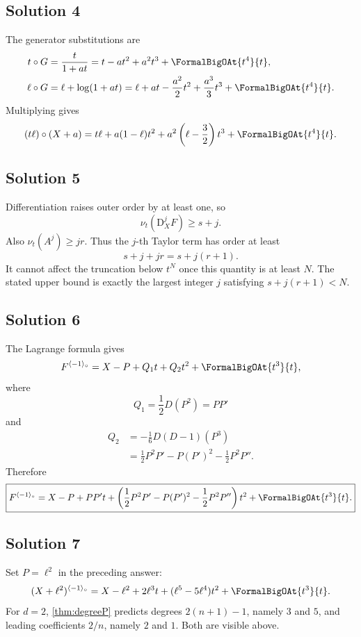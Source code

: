 \documentclass[11pt,oneside,openany]{book}
\newcommand{\ordt}{\nu_t}
\newcommand{\compose}{\mathbin{\circ}}
\newcommand{\rev}{^{\langle-1\rangle_{\circ}}}
\newcommand{\D}{\mathrm{D}}
\begin{document}
\subsection*{Solution 4}
The generator substitutions are
\begin{align*}
 t\compose G&=\frac{t}{1+at}
 =t-at^2+a^2t^3+\FormalBigOAt{t^4}{t},\\
 \ell\compose G&=\ell+\log(1+at)
 =\ell+at-\frac{a^2}{2}t^2+\frac{a^3}{3}t^3
 +\FormalBigOAt{t^4}{t}.
\end{align*}
Multiplying gives
\[
 (t\ell)\compose(X+a)
 =t\ell+a(1-\ell)t^2
 +a^2\left(\ell-\frac32\right)t^3
 +\FormalBigOAt{t^4}{t}.
\]

\subsection*{Solution 5}
Differentiation raises outer order by at least one, so
\[
 \ordt(\D_X^jF)\geq s+j.
\]
Also \(\ordt(A^j)\geq jr\).  Thus the \(j\)-th Taylor term has order at
least
\[
 s+j+jr=s+j(r+1).
\]
It cannot affect the truncation below \(t^N\) once this quantity is at least
\(N\).  The stated upper bound is exactly the largest integer \(j\) satisfying
\(s+j(r+1)<N\).

\subsection*{Solution 6}
The Lagrange formula gives
\[
 F\rev=X-P+Q_1t+Q_2t^2+\FormalBigOAt{t^3}{t},
\]
where
\[
 Q_1=\frac12D(P^2)=PP'
\]
and
\begin{align*}
 Q_2
 &=-\frac16D(D-1)(P^3)\\
 &=\frac12P^2P'-P(P')^2-\frac12P^2P''.
\end{align*}
Therefore
\begin{equation*}
 \boxed{
 F\rev=X-P+PP't+
 \left(\frac12P^2P'-P(P')^2-\frac12P^2P''\right)t^2
 +\FormalBigOAt{t^3}{t}.}
\end{equation*}

\subsection*{Solution 7}
Set \(P=\ell^2\) in the preceding answer:
\[
 (X+\ell^2)\rev
 =X-\ell^2+2\ell^3t+(\ell^5-5\ell^4)t^2
 +\FormalBigOAt{t^3}{t}.
\]
For \(d=2\), \cref{thm:degreeP} predicts degrees
\(2(n+1)-1\), namely \(3\) and \(5\), and leading coefficients
\(2/n\), namely \(2\) and \(1\).  Both are visible above.
\end{document}
